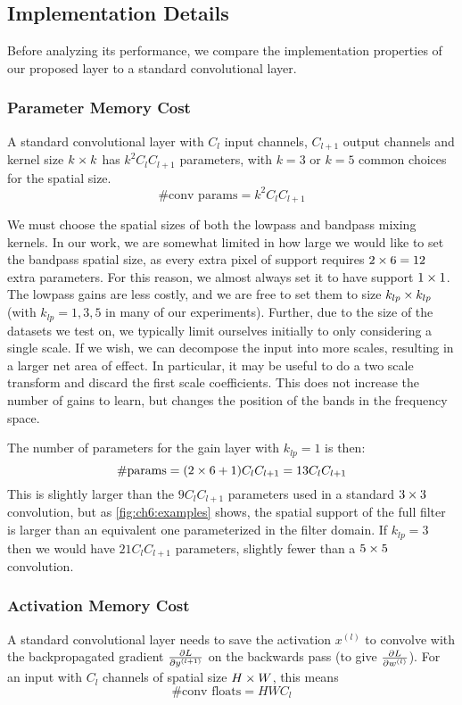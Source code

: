 \subsection{Implementation Details}
Before analyzing its performance, we compare the implementation properties of
our proposed layer to a standard convolutional layer.

\subsubsection{Parameter Memory Cost}\label{sec:ch6:memory}
A standard convolutional layer with $C_l$ input channels, $C_{l+1}$ output channels
and kernel size $k\times k$ has $k^2C_{l}C_{l+1}$ parameters, with $k=3$ or $k=5$
common choices for the spatial size.
\begin{equation}
  \text{\#conv params} = k^2C_lC_{l+1}
\end{equation}

We must choose the spatial sizes of both the lowpass and bandpass
mixing kernels. In our work, we are somewhat limited in how large we would like
to set the bandpass spatial size, as every extra pixel of support requires $2\times
6=12$ extra parameters. For this reason, we almost always set it to have 
support $1\times 1$. The lowpass gains are less costly, and we are free to set them to size
$k_{lp}\times k_{lp}$ (with $k_{lp} = 1,3,5$ in many of our experiments).
%
Further, due to the size of the datasets we test on, we typically limit
ourselves initially to only considering a single scale. If we wish, we can
decompose the input into more scales, resulting in a larger net area of effect.
In particular, it may be useful to do a two scale transform and discard the
first scale coefficients. This does not increase the number of gains to learn,
but changes the position of the bands in the frequency space.

The number of parameters for the gain layer with $k_{lp}=1$ is then:
\begin{equation}
  \text{\#params} = (2\times 6 + 1)C_lC_{l+1} = 13C_lC_{l+1} \label{eq:ch6:memcost2}
\end{equation} 
%
This is slightly larger than the $9C_lC_{l+1}$ parameters used in a
standard $3\times 3$ convolution, but as \autoref{fig:ch6:examples} shows, the
spatial support of the full filter is larger than an equivalent one
parameterized in the filter domain. If $k_{lp}=3$ then we would have $21C_l
C_{l+1}$ parameters, slightly fewer than a $5\times 5$ convolution.

\subsubsection{Activation Memory Cost}\label{sec:ch6:act_memory}
A standard convolutional layer needs to save the activation $x^{(l)}$ to
convolve with the backpropagated gradient $\frac{\partial L}{\partial y^{(l+1)}}$ on the backwards
pass (to give $\frac{\partial L}{\partial w^{(l)}}$). For an input with $C_l$ channels of spatial
size $H\times W$, this means
%
\begin{equation}
  \text{\#conv floats} = HWC_l 
\end{equation}

